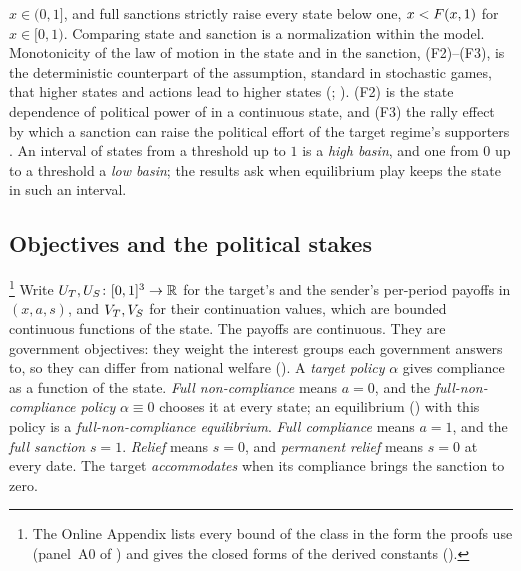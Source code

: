 $x\in(0,1]$, and full sanctions strictly raise every state below one,
$x<F(x,1)$ for $x\in[0,1)$. Comparing state and sanction is a normalization
within the model. Monotonicity of the law of motion in the state and in the sanction,
\textup{(F2)}--\textup{(F3)}, is the deterministic counterpart of the assumption,
standard in stochastic games, that higher states and actions lead to higher states
(\citealp[p.~185]{Curtat1996}; \citealp[p.~43]{Amir2002}). \textup{(F2)} is the state
dependence of political power of \citet[p.~278]{AcemogluRobinson2008} in a
continuous state, and \textup{(F3)} the rally effect by which a sanction can raise
the political effort of the target regime's supporters \citep[p.~791]{Kaempfer1988}. An interval of states from a threshold up to $1$ is a
\emph{high basin}, and one from $0$ up to a threshold a \emph{low basin}; the
results ask when equilibrium play keeps the state in such an interval.

\subsection{Objectives and the political stakes}
\label{sec:model:class}
\label{sec:model:objectives}

\footnote{The Online Appendix lists
every bound of the class in the form the proofs use (panel~A0 of
) and gives the closed forms of the derived constants
().} Write $U_T,U_S\colon[0,1]^3\to\mathbb{R}$ for the target's
and the sender's per-period payoffs in $(x,a,s)$, and $V_T,V_S$ for their
continuation values, which are bounded continuous functions of the state. The
payoffs are continuous. They are government objectives: they weight the
interest groups each government answers to, so they can differ from national
welfare (). A \emph{target policy} $\alpha$ gives compliance
as a function of the state. \emph{Full non-compliance} means $a=0$, and the
\emph{full-non-compliance policy} $\alpha\equiv0$ chooses it at every state; an
equilibrium () with this policy is a
\emph{full-non-compliance equilibrium}. \emph{Full compliance} means $a=1$, and the
\emph{full sanction} $s=1$. \emph{Relief} means $s=0$, and \emph{permanent
relief} means $s=0$ at every date. The target
\emph{accommodates} when its compliance brings the sanction to zero.

